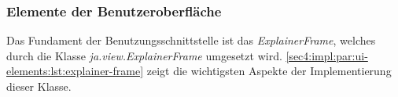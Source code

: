 \subsubsection{Elemente der Benutzeroberfläche}
\label{sec4:impl:par:ui-elements}






Das Fundament der Benutzungsschnittstelle ist das \textit{ExplainerFrame}, welches durch die Klasse \textit{ja.view.ExplainerFrame} umgesetzt wird.
\cref{sec4:impl:par:ui-elements:lst:explainer-frame} zeigt die wichtigsten Aspekte der Implementierung dieser Klasse.



